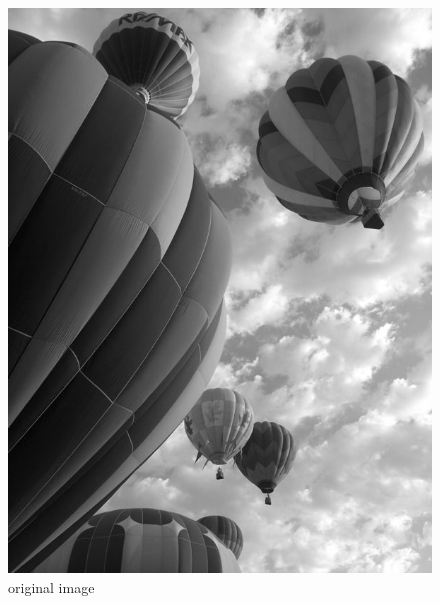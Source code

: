 \begin{figure}
\begin{minipage}[b]{.45\linewidth}
\centering
\includegraphics[width=\textwidth]{baloons_resized_bw.jpg}
\caption*{original image}
\end{minipage}
\hspace{0.5cm}
\begin{minipage}[b]{0.45\linewidth}
\centering

\end{minipage}
\end{figure}
